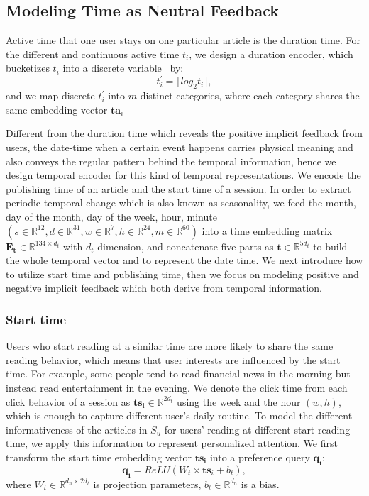 \subsection{Modeling Time as Neutral Feedback}
\label{sec: temporal}
Active time that one user stays on one particular article is the duration time. For the different and continuous active time $t_i$, we design a duration encoder, which
bucketizes $t_i$ into a discrete variable~\cite{wu2020CPRS} by: 
\begin{equation}
   t_i^{\prime}=\lfloor log_2{t_i} \rfloor,
\end{equation}
and we map discrete $t_i^{\prime}$ into $m$ distinct categories, 
where each category shares the same embedding vector $\mathbf{ta}_i$

Different from the duration time which reveals the positive implicit feedback 
from users, the date-time when a certain event happens carries physical 
meaning and also conveys the regular pattern behind the temporal information, 
hence we design temporal encoder for this kind of temporal representations. We encode the publishing time of an article and the start time of a session. In order to extract periodic temporal change which is also known as seasonality, we feed 
the month, day of the month, day of the week, hour, minute $(s\in \mathbb{R}^{12}, d \in \mathbb{R}^{31}, w \in \mathbb{R}^7, h\in \mathbb{R}^{24}, m\in \mathbb{R}^{60})$ into a time embedding matrix $\mathbf{E_t}\in \mathbb{R}^{134 \times d_t}$ with $d_t$ dimension, and concatenate five parts as $\mathbf{t} \in \mathbb{R}^{5d_t}$ to build the whole temporal vector and to represent the date time. We next introduce how to utilize start time and publishing time, then we focus on modeling positive and negative implicit feedback which both derive from temporal information.

\subsubsection{Start time}
Users who start reading at a similar time are more likely to share the 
same reading behavior, which means that user interests are influenced by 
the start time. For example, some people tend to read financial news in 
the morning but instead read entertainment in the evening. 
We denote the click time from each click behavior of a session 
as $\mathbf{ts_i}\in \mathbb{R}^{2d_t}$ using the week and the hour $(w, h)$, which is enough to capture different user's daily routine. To model the different informativeness of the articles in $S_u$ for users' reading at different start reading time, we apply this information to represent personalized attention. We first transform the start time embedding vector $\mathbf{ts_i}$ into a preference query $\mathbf{q_i}$:
\begin{equation}
    \mathbf{q_i} = ReLU(W_t \times \mathbf{ts}_i + b_t),
\end{equation}
where $W_t \in \mathbb{R}^{d_n \times 2d_t}$ is projection parameters, $b_t \in \mathbb{R}^{d_n}$ is a bias.

